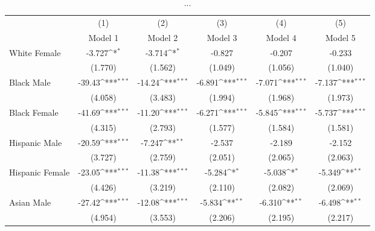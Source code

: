 \begin{table}[htbp]\centering
\def\sym#1{\ifmmode^{#1}\else\(^{#1}\)\fi}
\caption{...}
\begin{tabular}{l*{5}{c}}
\hline\hline
                    &\multicolumn{1}{c}{(1)}&\multicolumn{1}{c}{(2)}&\multicolumn{1}{c}{(3)}&\multicolumn{1}{c}{(4)}&\multicolumn{1}{c}{(5)}\\
                    &\multicolumn{1}{c}{Model 1}&\multicolumn{1}{c}{Model 2}&\multicolumn{1}{c}{Model 3}&\multicolumn{1}{c}{Model 4}&\multicolumn{1}{c}{Model 5}\\
\hline
White Female        &      -3.727\sym{*}  &      -3.714\sym{*}  &      -0.827         &      -0.207         &      -0.233         \\
                    &     (1.770)         &     (1.562)         &     (1.049)         &     (1.056)         &     (1.040)         \\
[1em]
Black Male          &      -39.43\sym{***}&      -14.24\sym{***}&      -6.891\sym{***}&      -7.071\sym{***}&      -7.137\sym{***}\\
                    &     (4.058)         &     (3.483)         &     (1.994)         &     (1.968)         &     (1.973)         \\
[1em]
Black Female        &      -41.69\sym{***}&      -11.20\sym{***}&      -6.271\sym{***}&      -5.845\sym{***}&      -5.737\sym{***}\\
                    &     (4.315)         &     (2.793)         &     (1.577)         &     (1.584)         &     (1.581)         \\
[1em]
Hispanic Male       &      -20.59\sym{***}&      -7.247\sym{**} &      -2.537         &      -2.189         &      -2.152         \\
                    &     (3.727)         &     (2.759)         &     (2.051)         &     (2.065)         &     (2.063)         \\
[1em]
Hispanic Female     &      -23.05\sym{***}&      -11.38\sym{***}&      -5.284\sym{*}  &      -5.038\sym{*}  &      -5.349\sym{**} \\
                    &     (4.426)         &     (3.219)         &     (2.110)         &     (2.082)         &     (2.069)         \\
[1em]
Asian Male          &      -27.42\sym{***}&      -12.08\sym{***}&      -5.834\sym{**} &      -6.310\sym{**} &      -6.498\sym{**} \\
                    &     (4.954)         &     (3.553)         &     (2.206)         &     (2.195)         &     (2.217)         \\

\end{tabular}
\end{table}
